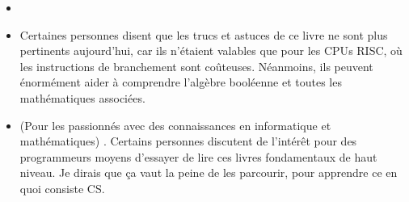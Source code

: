 \begin{itemize}

\item \RobPikePractice

\item \HenryWarren
Certaines personnes disent que les trucs et astuces de ce livre ne sont plus pertinents
aujourd'hui, car ils n'étaient valables que pour les \ac{CPU}s \ac{RISC}, où les instructions
de branchement sont coûteuses.
Néanmoins, ils peuvent énormément aider à comprendre l'algèbre booléenne et toutes les
mathématiques associées.

\item (Pour les passionnés avec des connaissances en informatique et mathématiques) \TAOCP.
Certains personnes discutent de l'intérêt pour des programmeurs moyens d'essayer de
lire ces livres fondamentaux de haut niveau.
Je dirais que ça vaut la peine de les parcourir, pour apprendre ce en quoi consiste \ac{CS}.

\end{itemize}



\iffalse
\subsection{Dédicace}

Comme le dit la première page de ce livre, ``Ce livre est dédicacé à Robert Jourdain,
John Socha, Ralf Brown et Peter Abel''.
Ce sont les auteurs de livres bien connus relatif au langage d'assemblage et de
référence des années 1980 et 1990:

\begin{itemize}
\item Robert Jourdain -- Programmer's problem solver for the IBM PC, XT, \& AT (1986)

\item Peter Norton and John Socha -- The Peter Norton Programmer's Guide to the IBM PC (1985),
Peter Norton's Assembly Language Book for the IBM PC (1989).
En fait, John Socha est l'auteur réel de ces livres, on peut dire qu'il était un
écrivain fantome. %
Il est aussi l'auteur de Norton Commander.

\item Ralph Brown était connu pour ``Ralf Brown's Interrupt List''\footnote{\url{http://www.ctyme.com/rbrown.htm}}.

\item Peter Abel -- IBM PC assembly language and programming (1991)
\end{itemize}

Ces livres sont dépassés, bien sûr.
Mais peut-être que quelqu'un se rappellera de ``ce temps là''.
\fi
